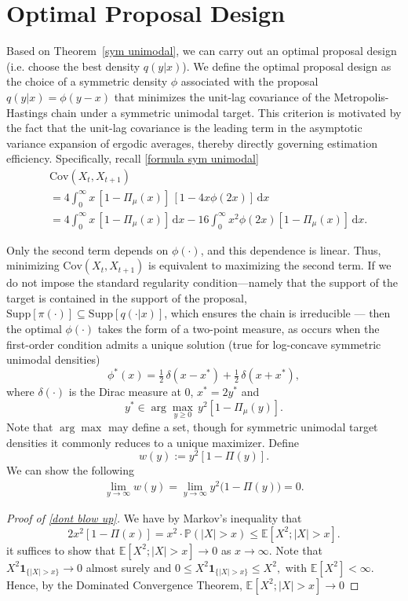 \documentclass[conference]{IEEEtran}
\newcommand{\df}{\mathrm{d}}
\theoremstyle{definition}
\begin{document}
\section{Optimal Proposal Design}
Based on Theorem~\ref{sym unimodal}, we can carry out an optimal proposal design (i.e.\,\,choose the best density \(q(y|x)\)). We define the optimal proposal design as the choice of a symmetric density $\phi$ 
associated with the proposal $q(y|x)=\phi(y-x)$ that minimizes the unit-lag covariance of the Metropolis-Hastings chain under a symmetric unimodal target. This criterion is motivated by the fact that the unit-lag covariance is the leading term in the asymptotic variance expansion of ergodic averages, thereby directly governing estimation efficiency.
Specifically, recall \eqref{formula sym unimodal}
\begin{align}\label{recall prop}
&\mathrm{Cov}(X_t,X_{t+1})\nonumber\nonumber\\
&= 4 \int_0^\infty x \,[1-\Pi_\mu(x)]\,[1-4x\phi(2x)]\,\df x \nonumber\\
&= 4 \int_0^\infty x \,[1-\Pi_\mu(x)]\,\df x
   - 16 \int_0^\infty x^2 \phi(2x)[1-\Pi_\mu(x)]\,\df x.
\end{align}

Only the second term depends on $\phi(\cdot)$, and this dependence is linear. 
Thus, minimizing $\mathrm{Cov}(X_t,X_{t+1})$ is equivalent to maximizing the second term. If we do not impose the standard regularity condition—namely that the support of the target is contained in the support of the proposal, 
$\mathrm{Supp}[\pi(\cdot)] \subseteq \mathrm{Supp}[q(\cdot|x)]$, which ensures the chain is irreducible — 
then the optimal $\phi(\cdot)$ takes the form of a two-point measure, as occurs when the first-order condition admits a unique solution (true for log-concave symmetric unimodal densities)
\[
\phi^*(x) = \tfrac{1}{2}\,\delta(x-x^*) + \tfrac{1}{2}\,\delta(x+x^*),
\]
where \(\delta(\cdot)\) is the Dirac measure at 0, $x^*=2y^*$ and
\[
y^* \in \arg\max_{y\ge 0}\, y^2[1-\Pi_\mu(y)].
\]
Note that $\arg\max$ may define a set, though for symmetric unimodal target densities it commonly reduces to a unique maximizer.
Define \[w(y):=y^2[1-\Pi(y)].\] We can show the following
\begin{align}\label{dont blow up}
    \lim_{y\to\infty}w(y)=\lim_{y\to\infty} y^{2}\bigl(1-\Pi(y)\bigr)=0.
\end{align}
\begin{proof}[Proof of \eqref{dont blow up}]
We have by Markov's inequality that
\[
2x^2[1-\Pi(x)] = x^2\cdot\mathbb{P}(|X| > x)
\le \mathbb{E}[X^{2}; |X| > x].
\]
it suffices to show that $\mathbb{E}[X^{2}; |X| > x] \to 0$ as $x \to \infty$.
Note that $X^{2}\mathbf{1}_{\{|X|>x\}} \to 0$ almost surely and
\(
0 \le X^{2}\mathbf{1}_{\{|X|>x\}} \le X^{2},
\)
with $\mathbb{E}[X^{2}] < \infty$. Hence, by the Dominated Convergence Theorem,
\(
\mathbb{E}[X^{2}; |X| > x] \to 0
\)
\end{proof}
\end{document}
